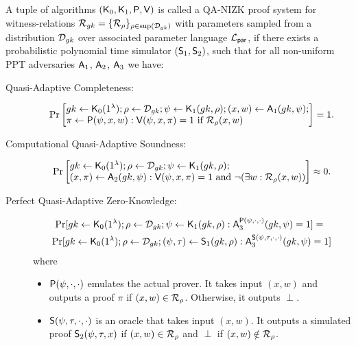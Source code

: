 A tuple of algorithms $(\mathsf{K}_0,\mathsf{K}_1,\mathsf{P},\mathsf{V})$ is called a QA-NIZK proof system for witness-relations
$\mathcal{R}_{gk} = \{\mathcal{R}_\rho\}_{\rho \in \mathrm{sup}(\mathcal{D}_{gk})}$
with parameters sampled from a distribution $\mathcal{D}_{gk}$ over associated parameter language
$\mathcal{L}_\mathsf{par}$, if there exists a probabilistic polynomial time simulator $(\mathsf{S}_1, \mathsf{S}_2)$,
such that for all non-uniform PPT adversaries $\mathsf{A}_1$, $\mathsf{A}_2$, $\mathsf{A}_3$ we have:

\begin{description}
\item[Quasi-Adaptive Completeness:]
$$\Pr\begin{bmatrix*}[l]
    \gk \gets \algK_0(1^\lambda);
    \rho \gets \dist_\gk;
    \psi \gets \algK_1(\gk, \rho);
    (x, w) \gets \advA_1(\gk, \psi);\\
    \pi \gets \algP(\psi, x, w) :
        \algV(\psi, x, \pi) = 1 \text{ if } \R_\rho(x, w)
\end{bmatrix*} = 1.$$
\item[Computational Quasi-Adaptive Soundness:]
$$\Pr\begin{bmatrix*}[l]
    \gk \gets \algK_0(1^\lambda);
    \rho \gets \dist_\gk;
    \psi \gets \algK_1(\gk, \rho); \\
    (x, \pi) \gets \advA_2(\gk, \psi) :
        \algV(\psi, x, \pi) = 1 \text{ and } \neg (\exists w : \R_\rho(x, w))
\end{bmatrix*} \approx 0.$$ 
\item[Perfect Quasi-Adaptive Zero-Knowledge:]
\begin{eqnarray*}
\Pr[
    {gk} \gets \mathsf{K}_0(1^\lambda);
    \rho \gets \mathcal{D}_{gk};
    \psi \gets \mathsf{K}_1({gk}, \rho):
        \mathsf{A}_3^{\mathsf{P}(\psi,\cdot, \cdot)}({gk},\psi) = 1]
=\;\;\;\\
\Pr[
    {gk} \gets \mathsf{K}_0(1^\lambda);
    \rho \gets \mathcal{D}_{gk};
    (\psi,\tau) \gets \mathsf{S}_1({gk}, \rho):
        \mathsf{A}_3^{\mathsf{S}(\psi,\tau,\cdot,\cdot)}({gk},\psi)=1]
\end{eqnarray*}
where
\begin{itemize}
\item $\mathsf{P}(\psi, \cdot, \cdot)$ emulates the actual prover. It takes input $(x,w)$ and outputs a 
proof $\pi$ if $(x,w)\in\mathcal{R}_\rho$. Otherwise, it outputs $\perp$.
\item $\mathsf{S}(\psi,\tau, \cdot, \cdot)$ is an oracle that takes input $(x,w)$. It outputs a simulated proof
$\mathsf{S}_2(\psi,\tau, x)$ if $(x, w) \in \mathcal{R}_\rho$ and $\perp$ if $(x, w) \notin \mathcal{R}_\rho$.
\end{itemize}
\end{description}
